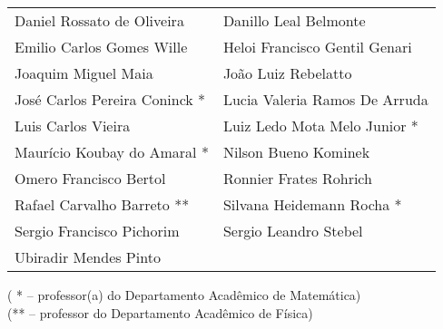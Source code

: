 {\begin{tabular}{ p{8cm} p{8cm} }
Daniel Rossato de Oliveira & Danillo Leal Belmonte \\
Emilio Carlos Gomes Wille & Heloi Francisco Gentil Genari \\
Joaquim Miguel Maia & João Luiz Rebelatto \\
José Carlos Pereira Coninck * & Lucia Valeria Ramos De Arruda \\
Luis Carlos Vieira & Luiz Ledo Mota Melo Junior * \\
Maurício Koubay do Amaral * & Nilson Bueno Kominek\\
Omero Francisco Bertol & Ronnier Frates Rohrich \\
Rafael Carvalho Barreto ** & Silvana Heidemann Rocha * \\
Sergio Francisco Pichorim & Sergio Leandro Stebel \\
Ubiradir Mendes Pinto \\

\end{tabular}
( * – professor(a) do Departamento Acadêmico de Matemática)\\
(** – professor do Departamento Acadêmico de Física)\\
\endgroup\clearpage}

